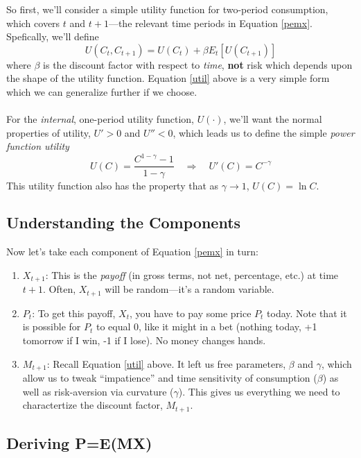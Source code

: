 \documentclass[a4paper,12pt]{scrartcl}
\begin{document}
So first, we'll consider a simple utility function for two-period
consumption, which covers $t$ and $t+1$---the relevant time periods
in Equation \ref{pemx}. Spefically, we'll define
\begin{equation}
    \label{util}
    U(C_t, C_{t+1}) = U(C_t) + \beta E_t\left[U(C_{t+1})\right]
\end{equation}
where $\beta$ is the discount factor with respect to \emph{time},
\textbf{not} risk which depends upon the shape of the utility function.
Equation \ref{util} above is a very simple form which we can generalize
further if we choose.
\\
\\
For the \emph{internal}, one-period utility function, $U(\cdot)$, we'll want
the normal properties of utility, $U'>0$ and $U''<0$, which leads
us to define the simple \emph{power function utility}
\begin{equation}
    \label{upwr}
    U(C) = \frac{C^{1-\gamma}-1}{1-\gamma} \quad\Rightarrow\quad
	U'(C) = C^{-\gamma}
\end{equation}
This utility function also has the property that as $\gamma\rightarrow 1$,
$U(C) = \ln C$.

\subsection{Understanding the Components}

Now let's take each component of Equation \ref{pemx} in turn:
\begin{enumerate}
    \item $X_{t+1}$: This is the \emph{payoff} (in gross
	terms, not net, percentage, etc.) at time $t+1$.  Often, $X_{t+1}$ 
	will be random---it's a random variable.
    \item $P_t$: To get this payoff, $X_t$, you have to pay some price $P_t$ today. Note that
	it is possible for $P_t$ to equal 0, like it might in a bet (nothing
	today, +1 tomorrow if I win, -1 if I lose). No money changes hands.
    \item $M_{t+1}$: Recall Equation \ref{util} above.  It left
	us free parameters, $\beta$ and $\gamma$, which allow us
	to tweak ``impatience'' and time sensitivity of consumption 
	($\beta$) as well as risk-aversion via curvature ($\gamma$).
	This gives us everything we need to charactertize the discount
	factor, $M_{t+1}$.
\end{enumerate}

\newpage
\subsection{Deriving P=E(MX)}
\end{document}
